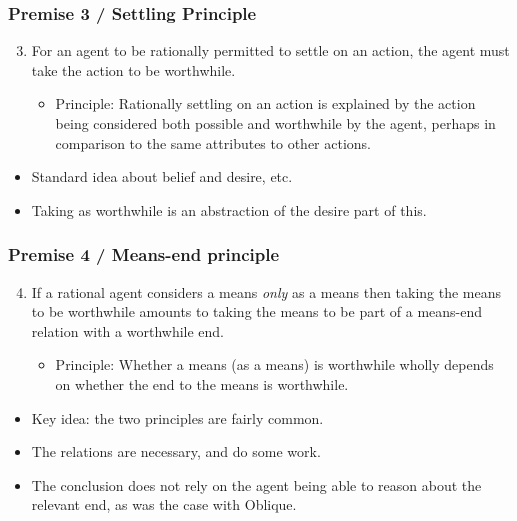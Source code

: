 \documentclass[noamssymb, compress, handout]{beamer} %
\begin{document}
\begin{frame}
  \frametitle{Premise 3 / Settling Principle}

  \begin{enumerate}
    \setcounter{enumi}{2}
  \item For an agent to be rationally permitted to settle on an action, the agent must take the action to be worthwhile.
    \begin{itemize}
    \item Principle: Rationally settling on an action is explained by the action being considered both possible and worthwhile by the agent, perhaps in comparison to the same attributes to other actions.
    \end{itemize}
  \end{enumerate}

  \begin{itemize}
  \item Standard idea about belief and desire, etc.
  \item Taking as worthwhile is an abstraction of the desire part of this.
  \end{itemize}
\end{frame}

\begin{frame}
  \frametitle{Premise 4 / Means-end principle}

  \begin{enumerate}
    \setcounter{enumi}{3}
  \item If a rational agent considers a means \emph{only} as a means then taking the means to be worthwhile amounts to taking the means to be part of a means-end relation with a worthwhile end.
    \begin{itemize}
    \item Principle: Whether a means (as a means) is worthwhile wholly depends on whether the end to the means is worthwhile.
    \end{itemize}
  \end{enumerate}

\end{frame}


\begin{frame}
  \begin{itemize}
  \item Key idea: the two principles are fairly common.
  \item The relations are necessary, and do some work.
  \item The conclusion does not rely on the agent being able to reason about the relevant end, as was the case with Oblique.
  \end{itemize}
\end{frame}
\end{document}
